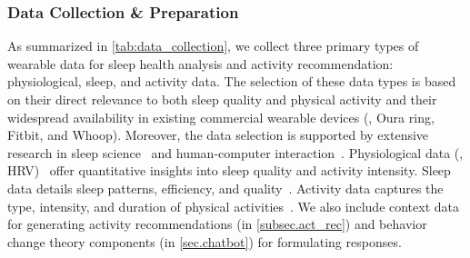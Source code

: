 \subsubsection{Data Collection \& Preparation}
As summarized in \autoref{tab:data_collection}, we collect three primary types of wearable data for sleep health analysis and activity recommendation: physiological, sleep, and activity data.
The selection of these data types is based on their direct relevance to both sleep quality and physical activity and their widespread availability in existing commercial wearable devices (\eg, Oura ring, Fitbit, and Whoop).
Moreover, the data selection is supported by extensive research in sleep science~\cite{shaffer2017overview, ohayon2017national, kredlow2015effects, peake2018critical} and human-computer interaction~\cite{liang2016sleep}.
Physiological data (\eg, HRV)~\cite{shaffer2017overview}
offer quantitative insights into sleep quality and activity intensity.
Sleep data details sleep patterns, efficiency, and quality~\cite{ohayon2017national}.
Activity data captures the type, intensity, and duration of physical activities~\cite{kredlow2015effects}.
We also include context data for generating activity recommendations (in \autoref{subsec.act_rec}) and behavior change theory components (in \autoref{sec.chatbot}) for formulating responses.


